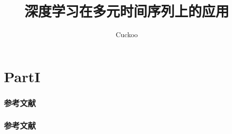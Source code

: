 \documentclass[twoside,CJK,openany,UTF8,fancyhdr]{ctexbook}%
\begin{document}
\renewcommand{\contentsname}{目录}     %
\renewcommand{\abstractname}{摘要}     %
\renewcommand{\refname}{参考文献}      %
\renewcommand{\indexname}{索引}
\renewcommand{\figurename}{图}
\renewcommand{\tablename}{表}
\renewcommand{\appendixname}{附录}
\renewcommand{\proofname}{证明}





\author{Cuckoo}
\title{深度学习在多元时间序列上的应用}

\maketitle

\setlength{\parskip}{0.25 \baselineskip}
\newlength{\figwidth}
\setlength{\figwidth}{26pc}
\newlength{\notationgap}
\setlength{\notationgap}{1pc}

\graphicspath{
{chapter00/}
{chapter01/}
{chapter02/}
{chapter03/}
{chapter04/}
{chapter05/}
{chapter06/}
{chapter07/}
{chapter08/}
{chapter09/}
}













%


\tableofcontents
\newpage
\part{PartI}
\newpage




\section*{参考文献}\printbibliography[segment=\therefsegment,heading=none]


\newpage
\section*{参考文献}\printbibliography[segment=\therefsegment,heading=none]
\end{document}

